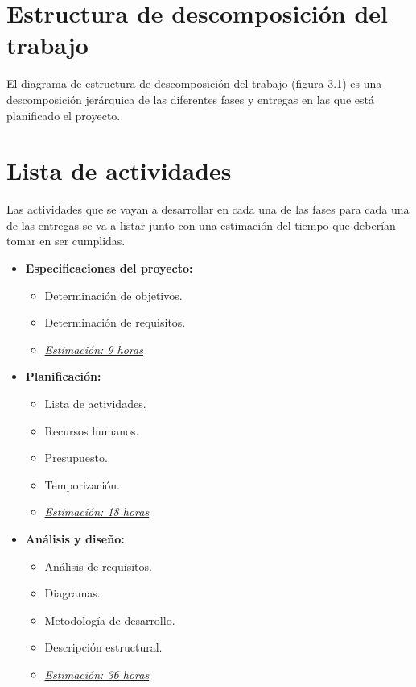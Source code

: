 \section{Estructura de descomposición del trabajo}

El diagrama de estructura de descomposición del trabajo (figura 3.1) es una descomposición jerárquica de las diferentes fases y entregas en las que está planificado el proyecto.

\newpage
\section{Lista de actividades}

Las actividades que se vayan a desarrollar en cada una de las fases para cada una de las entregas se va a listar junto con una estimación del tiempo que deberían tomar en ser cumplidas.

\begin{itemize}
   \item \textbf{Especificaciones del proyecto:}
   \begin{itemize}
    \item Determinación de objetivos.
    \item Determinación de requisitos.
    \item \underline{\textit{Estimación: 9 horas}}
    \end{itemize}
\end{itemize}

\begin{itemize}
   \item \textbf{Planificación:}
   \begin{itemize}
    \item Lista de actividades.
    \item Recursos humanos.
    \item Presupuesto.
    \item Temporización.
    \item \underline{\textit{Estimación: 18 horas}}
   \end{itemize}
\end{itemize}

\begin{itemize}
   \item \textbf{Análisis y diseño:}
   \begin{itemize}
    \item Análisis de requisitos.
    \item Diagramas.
    \item Metodología de desarrollo.
    \item Descripción estructural.
    \item \underline{\textit{Estimación: 36 horas}}
   \end{itemize}
\end{itemize}

